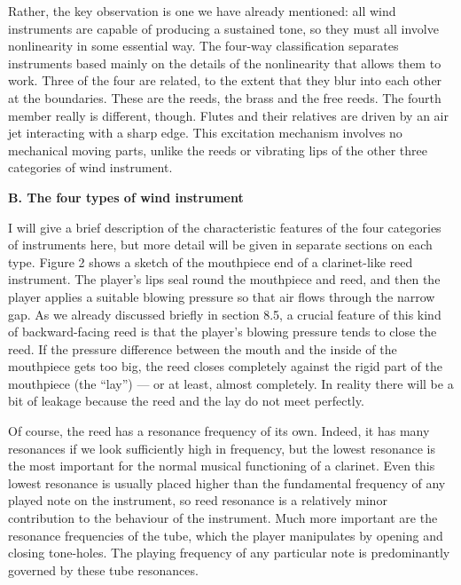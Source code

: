   Rather, the key observation is one we have already mentioned: all wind 
  instruments are capable of producing a sustained tone, so they must all 
  involve nonlinearity in some essential way. The four-way classification 
  separates instruments based mainly on the details of the nonlinearity that 
  allows them to work. Three of the four are related, to the extent that they 
  blur into each other at the boundaries. These are the reeds, the brass and 
  the free reeds. The fourth member really is different, though. Flutes and 
  their relatives are driven by an air jet interacting with a sharp edge. This 
  excitation mechanism involves no mechanical moving parts, unlike the reeds or 
  vibrating lips of the other three categories of wind instrument. 

  \textbf{B. The four types of wind instrument} 

  I will give a brief description of the characteristic features of the four 
  categories of instruments here, but more detail will be given in separate 
  sections on each type. Figure 2 shows a sketch of the mouthpiece end of a 
  clarinet-like reed instrument. The player’s lips seal round the mouthpiece 
  and reed, and then the player applies a suitable blowing pressure so that air 
  flows through the narrow gap. As we already discussed briefly in section 8.5, 
  a crucial feature of this kind of backward-facing reed is that the player’s 
  blowing pressure tends to close the reed. If the pressure difference between 
  the mouth and the inside of the mouthpiece gets too big, the reed closes 
  completely against the rigid part of the mouthpiece (the “lay”) — or at 
  least, almost completely. In reality there will be a bit of leakage because 
  the reed and the lay do not meet perfectly. 


  Of course, the reed has a resonance frequency of its own. Indeed, it has many 
  resonances if we look sufficiently high in frequency, but the lowest 
  resonance is the most important for the normal musical functioning of a 
  clarinet. Even this lowest resonance is usually placed higher than the 
  fundamental frequency of any played note on the instrument, so reed resonance 
  is a relatively minor contribution to the behaviour of the instrument. Much 
  more important are the resonance frequencies of the tube, which the player 
  manipulates by opening and closing tone-holes. The playing frequency of any 
  particular note is predominantly governed by these tube resonances. 

